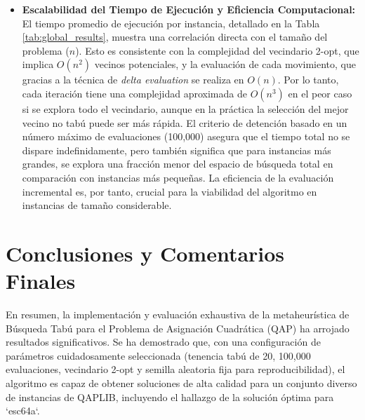 \documentclass[12pt, a4paper]{article}
\begin{document}
\begin{itemize}
    \item \textbf{Escalabilidad del Tiempo de Ejecución y Eficiencia Computacional:} El tiempo promedio de ejecución por instancia, detallado en la Tabla \ref{tab:global_results}, muestra una correlación directa con el tamaño del problema (\(n\)). Esto es consistente con la complejidad del vecindario 2-opt, que implica \(O(n^2)\) vecinos potenciales, y la evaluación de cada movimiento, que gracias a la técnica de \textit{delta evaluation} se realiza en \(O(n)\). Por lo tanto, cada iteración tiene una complejidad aproximada de \(O(n^3)\) en el peor caso si se explora todo el vecindario, aunque en la práctica la selección del mejor vecino no tabú puede ser más rápida. El criterio de detención basado en un número máximo de evaluaciones (100,000) asegura que el tiempo total no se dispare indefinidamente, pero también significa que para instancias más grandes, se explora una fracción menor del espacio de búsqueda total en comparación con instancias más pequeñas. La eficiencia de la evaluación incremental es, por tanto, crucial para la viabilidad del algoritmo en instancias de tamaño considerable.
\end{itemize}

\clearpage

\section{Conclusiones y Comentarios Finales}


En resumen, la implementación y evaluación exhaustiva de la metaheurística de Búsqueda Tabú para el Problema de Asignación Cuadrática (QAP) ha arrojado resultados significativos. Se ha demostrado que, con una configuración de parámetros cuidadosamente seleccionada (tenencia tabú de 20, 100,000 evaluaciones, vecindario 2-opt y semilla aleatoria fija para reproducibilidad), el algoritmo es capaz de obtener soluciones de alta calidad para un conjunto diverso de instancias de QAPLIB, incluyendo el hallazgo de la solución óptima para `esc64a`.
\end{document}
